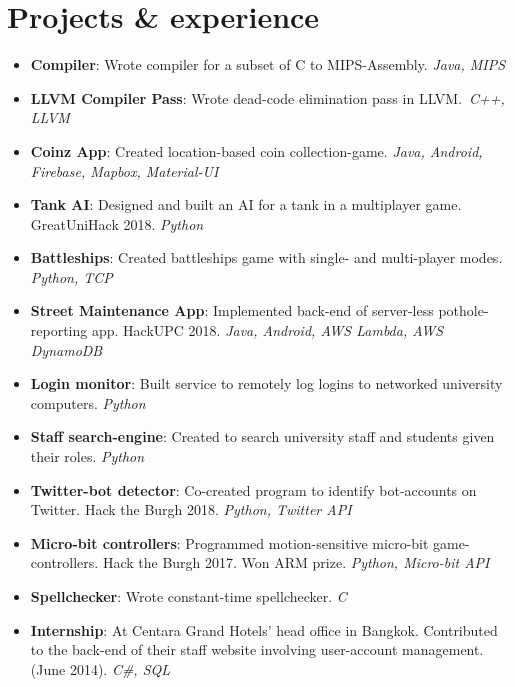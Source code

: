 \documentclass[11pt,a4paper]{article}
\begin{document}
\section*{Projects \& experience}
\begin{itemize}
    \item \textbf{Compiler}:
        Wrote compiler for a subset of C to MIPS-Assembly.
        \textit{Java, MIPS}
    \item \textbf{LLVM Compiler Pass}:
        Wrote dead-code elimination pass in LLVM.\
        \textit{C++, LLVM}
    \item \textbf{Coinz App}:
        Created location-based coin collection-game.
		\textit{Java, Android, Firebase, Mapbox, Material-UI}
    \item \textbf{Tank AI}:
        Designed and built an AI for a tank in a multiplayer game. GreatUniHack 2018.
        \textit{Python}
    \item \textbf{Battleships}:
        Created battleships game with single- and multi-player modes.
        \textit{Python, TCP}
    \item \textbf{Street Maintenance App}:
        Implemented back-end of server-less pothole-reporting app. HackUPC 2018.
		\textit{Java, Android, AWS Lambda, AWS DynamoDB}
    \item \textbf{Login monitor}:
        Built service to remotely log logins to networked university computers.
        \textit{Python}
    \item \textbf{Staff search-engine}:
        Created to search university staff and students given their roles.
        \textit{Python}
    \item \textbf{Twitter-bot detector}:
        Co-created program to identify bot-accounts on Twitter. Hack the Burgh 2018.
        \textit{Python, Twitter API}
    \item \textbf{Micro-bit controllers}:
        Programmed motion-sensitive micro-bit game-controllers. Hack the Burgh 2017.
        Won ARM prize.
        \textit{Python, Micro-bit API}
    \item \textbf{Spellchecker}:
        Wrote constant-time spellchecker.
        \textit{C}
    \item \textbf{Internship}:
        At Centara Grand Hotels' head office in Bangkok.
        Contributed to the back-end of their staff website involving user-account management.
        (June 2014).
        \textit{C\#, SQL}
\end{itemize}

\hline
\end{document}
